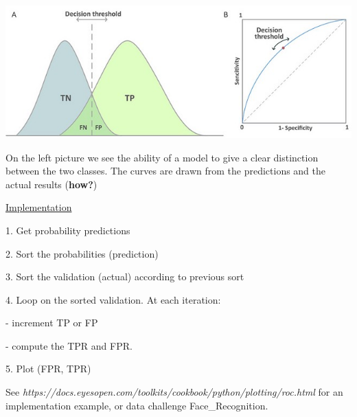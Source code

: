 \vspace{5mm}

\includegraphics[scale=0.5]{../images/overlap_roc.jpeg}

\vspace{5mm}

On the left picture we see the ability of a model to give a clear distinction between the two classes. The curves are drawn from the predictions and the actual results (\textbf{how?})

\vspace{5mm}

\underline{Implementation}

\vspace{5mm}

1. Get probability predictions

2. Sort the probabilities (prediction)

3. Sort the validation (actual) according to previous sort

4. Loop on the sorted validation. At each iteration:

- increment TP or FP

- compute the TPR and FPR.

5. Plot (FPR, TPR)

\vspace{5mm}

See \textit{https://docs.eyesopen.com/toolkits/cookbook/python/plotting/roc.html} for an implementation example, or data challenge Face\_Recognition.

\vspace{5mm}
